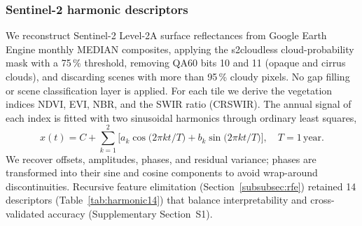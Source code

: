 \documentclass[utf8]{FrontiersinHarvard}
\begin{document}
\subsubsection{Sentinel-2 harmonic descriptors}
We reconstruct Sentinel-2 Level-2A surface reflectances from Google Earth Engine monthly MEDIAN composites, applying the s2cloudless cloud-probability mask with a 75\,\% threshold, removing QA60 bits 10 and 11 (opaque and cirrus clouds), and discarding scenes with more than 95\,\% cloudy pixels. No gap filling or scene classification layer is applied. For each tile we derive the vegetation indices NDVI, EVI, NBR, and the SWIR ratio (CRSWIR). The annual signal of each index is fitted with two sinusoidal harmonics through ordinary least squares,
\[
  x(t) = C + \sum_{k=1}^{2} \big[a_k \cos\!\big(2\pi k t/T\big) + b_k \sin\!\big(2\pi k t/T\big)\big], \quad T = 1\,\text{year}.
\]
We recover offsets, amplitudes, phases, and residual variance; phases are transformed into their sine and cosine components to avoid wrap-around discontinuities. Recursive feature elimitation (Section~\ref{subsubsec:rfe}) retained 14 descriptors (Table~\ref{tab:harmonic14}) that balance interpretability and cross-validated accuracy (Supplementary Section~S1). 
\end{document}
